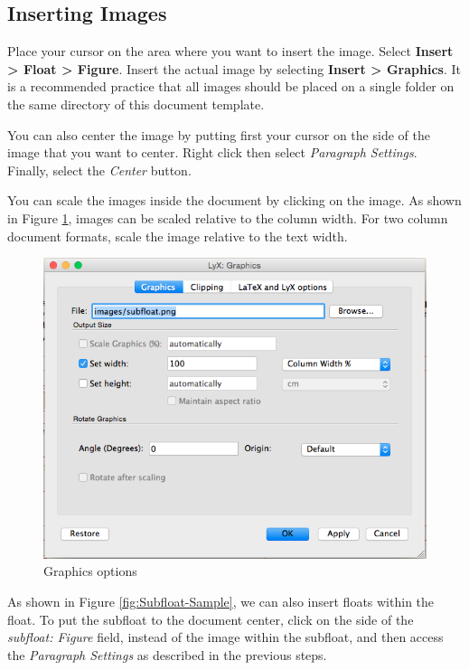 \subsection{Inserting Images}

Place your cursor on the area where you want to insert the image.
Select \textbf{Insert \textgreater{} Float \textgreater{} Figure}.
Insert the actual image by selecting \textbf{Insert \textgreater{}
Graphics}. It is a recommended practice that all images should be
placed on a single folder on the same directory of this \LyX{} document
template.

You can also center the image by putting first your cursor on the
side of the image that you want to center. Right click then select
\textit{Paragraph Settings}. Finally, select the \textit{Center} button. 

You can scale the images inside the document by clicking on the image.
As shown in Figure \ref{fig:LyX-Graphics-options}, images can be
scaled relative to the column width. For two column document formats,
scale the image relative to the text width.

\begin{figure}[H]
\begin{centering}
\includegraphics[width=0.6\columnwidth]{images/image_scale}
\par\end{centering}
\caption{\protect\LyX{} Graphics options\label{fig:LyX-Graphics-options}}
\end{figure}

As shown in Figure \ref{fig:Subfloat-Sample}, we can also insert
floats within the float. To put the subfloat to the document center,
click on the side of the \textit{subfloat: Figure} field, instead
of the image within the subfloat, and then access the \textit{Paragraph
Settings} as described in the previous steps. 

